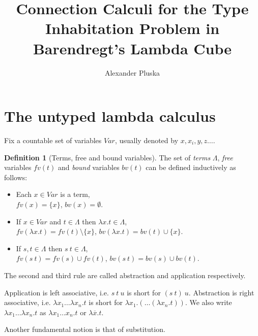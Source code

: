 \documentclass[11pt]{article}
\title{Connection Calculi for the Type Inhabitation Problem in Barendregt's Lambda Cube}
\author{Alexander Pluska}
\theoremstyle{definition}
\theoremstyle{definition}
\theoremstyle{definition}
\theoremstyle{definition}
\theoremstyle{definition}
\newtheorem{definition}[theorem]{Definition}
\theoremstyle{definition}
\theoremstyle{definition}
\newcommand{\fv}{\mathit{fv}}
\newcommand{\bv}{\mathit{bv}}
\newcommand{\var}{\mathit{Var}}
\begin{document}
    \maketitle

	\section{The untyped lambda calculus}

	Fix a countable set of variables $Var$, usually denoted by $x, x_i, y, z\dots$.
	
	\begin{definition}[Terms, free and bound variables]
		The set of \emph{terms} $\Lambda$, \emph{free} variables $\fv(t)$ and \emph{bound} variables $\bv(t)$ can be defined inductively as follows:
		\begin{itemize}
			\item Each $x\in \var$ is a term,\\$\fv(x) = \{x\}$, $\bv(x) = \emptyset$.
			\item If $x\in \var$ and $t\in\Lambda$
			then $\lambda x. t\in\Lambda$,\\$\fv(\lambda x. t) = \fv(t)\setminus\{x\}$, $\bv(\lambda x. t) = \bv(t)\cup\{x\}$.
			\item If $s, t\in\Lambda$ then $s\ t\in\Lambda$,\\$\fv(s\ t) = \fv(s)\cup\fv(t)$, $\bv(s\ t) = \bv(s)\cup\bv(t)$.
		\end{itemize}
		The second and third rule are called abstraction and application respectively.
	\end{definition}

	Application is left associative, i.e. $s\ t\ u$ is short for $(s\ t)\ u$.
	Abstraction is right associative, i.e. $\lambda x_1\dots \lambda x_n. t$ is short for $\lambda x_1. (\dots (\lambda x_n. t))$. We also write $\lambda x_1\dots\lambda x_n. t$ as $\lambda x_1\dots x_n. t$ or $\lambda \overline{x}. t$.

	Another fundamental notion is that of substitution.
\end{document}
